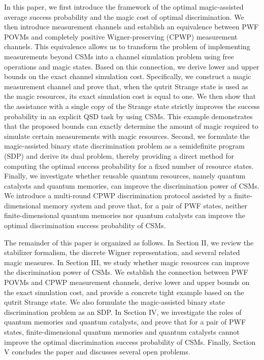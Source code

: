 \documentclass[aps,pra,twocolumn,floatfix,amsfonts,10pt]{revtex4-2}
\begin{document}
In this paper, we first introduce the framework of the optimal magic-assisted average success probability and the magic cost of optimal discrimination. 
We then introduce measurement channels and establish an equivalence between PWF POVMs and completely positive Wigner-preserving (CPWP) measurement channels. 
This equivalence allows us to transform the problem of implementing measurements beyond CSMs into a channel simulation problem using free operations and magic states. 
Based on this connection, we derive lower and upper bounds on the exact channel simulation cost. 
Specifically, we construct a magic measurement channel and prove that, when the qutrit Strange state is used as the magic resources, its exact simulation cost is equal to one. 
We then show that the assistance with a single copy of the Strange state strictly improves the success probability in an explicit QSD task by using CSMs.
This example demonstrates that the proposed bounds can exactly determine the amount of magic required to simulate certain measurements with magic resources.
Second, we formulate the magic-assisted binary state discrimination problem as a semidefinite program (SDP) and derive its dual problem, thereby providing a direct method for computing the optimal success probability for a fixed number of resource states. 
Finally, we investigate whether reusable quantum resources, namely quantum catalysts and quantum memories, can improve the discrimination power of CSMs. 
We introduce a multi-round CPWP discrimination protocol assisted by a finite-dimensional memory system and prove that, for a pair of PWF states, neither finite-dimensional quantum memories nor quantum catalysts can improve the optimal discrimination success probability of CSMs.

The remainder of this paper is organized as follows. 
In Section II, we review the stabilizer formalism, the discrete Wigner representation, and several related magic measures. 
In Section III, we study whether magic resources can improve the discrimination power of CSMs. 
We establish the connection between PWF POVMs and CPWP measurement channels, derive lower and upper bounds on the exact simulation cost, and provide a concrete tight example based on the qutrit Strange state. 
We also formulate the magic-assisted binary state discrimination problem as an SDP. 
In Section IV, we investigate the roles of quantum memories and quantum catalysts, and prove that for a pair of PWF states, finite-dimensional quantum memories and quantum catalysts cannot improve the optimal discrimination success probability of CSMs. 
Finally, Section V concludes the paper and discusses several open problems.
\end{document}

